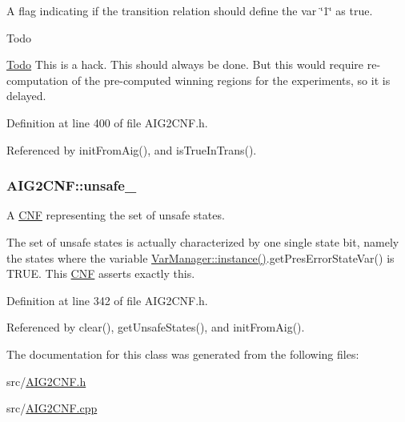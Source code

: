 A flag indicating if the transition relation should define the var \char`\"{}1\char`\"{} as true. 

\begin{DoxyRefDesc}{Todo}
\item[\hyperlink{todo__todo000002}{Todo}]This is a hack. This should always be done. But this would require re-\/computation of the pre-\/computed winning regions for the experiments, so it is delayed. \end{DoxyRefDesc}


Definition at line 400 of file A\-I\-G2\-C\-N\-F.\-h.



Referenced by init\-From\-Aig(), and is\-True\-In\-Trans().

\hypertarget{classAIG2CNF_afbfcf3a27261a2283a99362d2527d64f}{
\subsubsection[{unsafe\-\_\-}]{ A\-I\-G2\-C\-N\-F\-::unsafe\-\_\-\hspace{0.3cm}{\ttfamily [protected]}}}\label{classAIG2CNF_afbfcf3a27261a2283a99362d2527d64f}


A \hyperlink{classCNF}{C\-N\-F} representing the set of unsafe states. 

The set of unsafe states is actually characterized by one single state bit, namely the states where the variable \hyperlink{classVarManager_ac1a84b367c26dfc5ee9e612f7d61b288}{Var\-Manager\-::instance()}.get\-Pres\-Error\-State\-Var() is T\-R\-U\-E. This \hyperlink{classCNF}{C\-N\-F} asserts exactly this. 

Definition at line 342 of file A\-I\-G2\-C\-N\-F.\-h.



Referenced by clear(), get\-Unsafe\-States(), and init\-From\-Aig().



The documentation for this class was generated from the following files\-:\begin{DoxyCompactItemize}
\item 
src/\hyperlink{AIG2CNF_8h}{A\-I\-G2\-C\-N\-F.\-h}\item 
src/\hyperlink{AIG2CNF_8cpp}{A\-I\-G2\-C\-N\-F.\-cpp}\end{DoxyCompactItemize}
